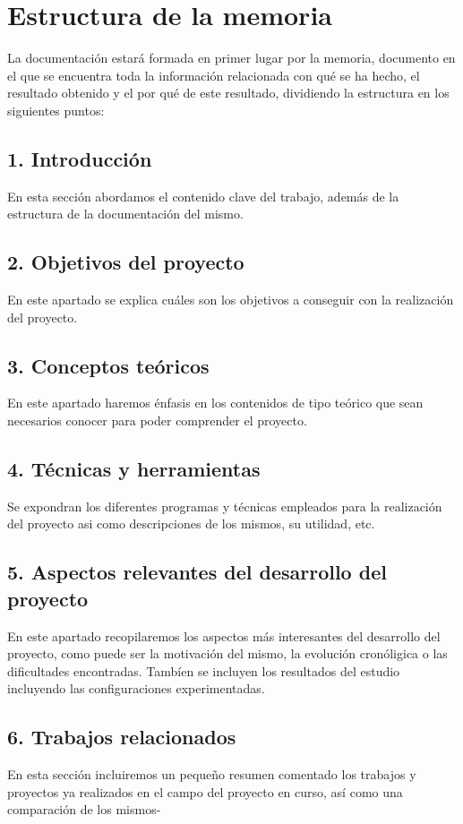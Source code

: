 \section{Estructura de la memoria}
La documentación estará formada en primer lugar por la memoria, documento en el que se encuentra toda la información relacionada con qué se ha hecho, el resultado obtenido y el por qué de este resultado, dividiendo la estructura en los siguientes puntos:

\subsection{  1. Introducción}
En esta sección abordamos el contenido clave del trabajo, además de la estructura de la documentación del mismo.
\subsection{  2. Objetivos del proyecto}
En este apartado se explica cuáles son los objetivos a conseguir con la realización del proyecto.
\subsection{  3. Conceptos teóricos}
En este apartado haremos énfasis en los contenidos de tipo teórico que sean necesarios conocer para poder comprender el proyecto.
\subsection{  4. Técnicas y herramientas}
Se expondran los diferentes programas y técnicas empleados para la realización del proyecto asi como descripciones de los mismos, su utilidad, etc.
\subsection{  5. Aspectos relevantes del desarrollo del proyecto}
En este apartado recopilaremos los aspectos más interesantes del desarrollo del proyecto, como puede ser la motivación del mismo, la evolución cronóligica o las dificultades encontradas. Tambíen se incluyen los resultados del estudio incluyendo las configuraciones experimentadas.
\subsection{  6. Trabajos relacionados}
En esta sección incluiremos un pequeño resumen comentado los trabajos y proyectos ya realizados en el campo del proyecto en curso, así como una comparación de los mismos-
